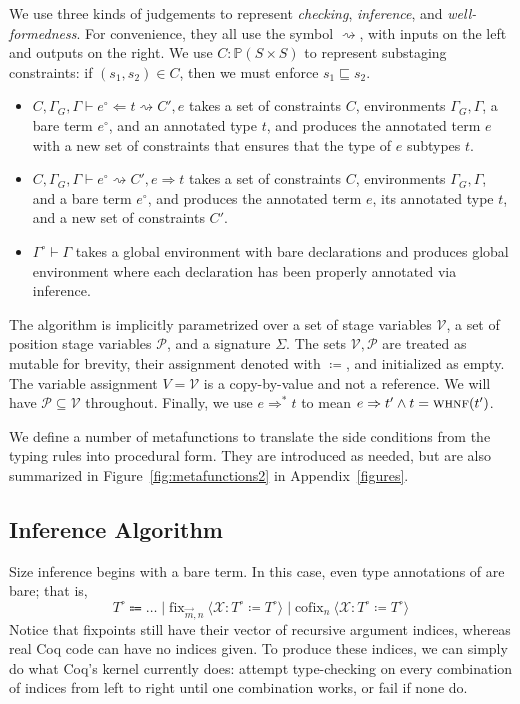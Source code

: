 \documentclass[sigplan,10pt,anonymous,review,nonacm]{acmart}
\begin{document}
We use three kinds of judgements to represent \textit{checking}, \textit{inference}, and \textit{well-formed\-ness}. For convenience, they all use the symbol $\rightsquigarrow$, with inputs on the left and outputs on the right. We use $C : \mathbb{P}(S \times S)$ to represent substaging constraints: if $(s_1, s_2) \in C$, then we must enforce $s_1 \sqsubseteq s_2$.
\begin{itemize}
    \item $C, \Gamma_G, \Gamma \vdash e^\circ \Leftarrow t \rightsquigarrow C', e$ takes a set of constraints $C$, environments $\Gamma_G, \Gamma$, a bare term $e^\circ$, and an annotated type $t$, and produces the annotated term $e$ with a new set of constraints that ensures that the type of $e$ subtypes $t$.
    \item $C, \Gamma_G, \Gamma \vdash e^\circ \rightsquigarrow C', e \Rightarrow t$ takes a set of constraints $C$, environments $\Gamma_G, \Gamma$, and a bare term $e^\circ$, and produces the annotated term $e$, its annotated type $t$, and a new set of constraints $C'$.
    \item $\Gamma^\circ \vdash \Gamma$ takes a global environment with bare declarations and produces global environment where each declaration has been properly annotated via inference.
\end{itemize}

The algorithm is implicitly parametrized over a set of stage variables $\mathcal{V}$, a set of position stage variables $\mathcal{P}$, and a signature $\Sigma$. The sets $\mathcal{V}, \mathcal{P}$ are treated as mutable for brevity, their assignment denoted with $\coloneqq$, and initialized as empty. The variable assignment $V = \mathcal{V}$ is a copy-by-value and not a reference. We will have $\mathcal{P} \subseteq \mathcal{V}$ throughout. Finally, we use $e \Rightarrow^* t$ to mean $e \Rightarrow t' \wedge t = \textsc{whnf}(t')$.

We define a number of metafunctions to translate the side conditions from the typing rules into procedural form. They are introduced as needed, but are also summarized in Figure~\ref{fig:metafunctions2} in Appendix~\ref{figures}.

\subsection{Inference Algorithm}



Size inference begins with a bare term. In this case, even type annotations of \cofixpoints are bare; that is, $$T^\circ \Coloneqq \dots \mid \text{fix}_{\vec{m}, n}\ \langle \mathcal{X} : T^\circ \coloneqq T^\circ \rangle \mid \text{cofix}_{n}\ \langle \mathcal{X} : T^\circ \coloneqq T^\circ \rangle$$
Notice that fixpoints still have their vector of recursive argument indices, whereas real Coq code can have no indices given. To produce these indices, we can simply do what Coq's kernel currently does: attempt type-checking on every combination of indices from left to right until one combination works, or fail if none do.
\end{document}
